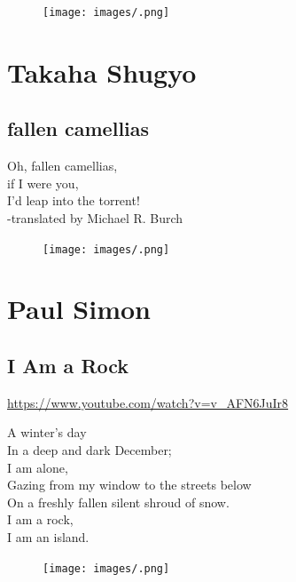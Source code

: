 \documentclass[]{book}
\renewenvironment{quote}{\begin{VF}}{\end{VF}}
\begin{document}
\begin{figure}[htbp]
\centering
\texttt{[image: images/.png]}
\caption{}
\end{figure}

\chapter{Takaha Shugyo}\label{takaha-shugyo}

\section{fallen camellias}\label{fallen-camellias}

\begin{quote}
Oh, fallen camellias,\\
if I were you,\\
I'd leap into the torrent!\\
-translated by Michael R. Burch
\end{quote}

\begin{figure}[htbp]
\centering
\texttt{[image: images/.png]}
\caption{}
\end{figure}

\chapter{Paul Simon}\label{paul-simon}

\section{I Am a Rock}\label{i-am-a-rock}

\url{https://www.youtube.com/watch?v=v_AFN6JuIr8}

\begin{quote}
A winter's day\\
In a deep and dark December;\\
I am alone,\\
Gazing from my window to the streets below\\
On a freshly fallen silent shroud of snow.\\
I am a rock,\\
I am an island.
\end{quote}

\begin{figure}[htbp]
\centering
\texttt{[image: images/.png]}
\caption{}
\end{figure}
\end{document}
